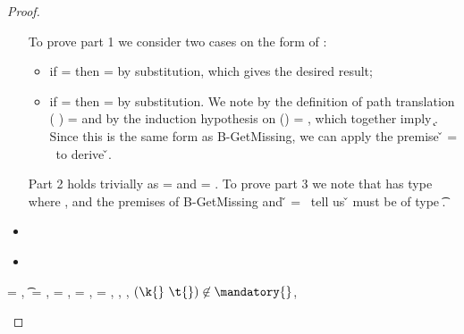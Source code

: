 \begin{lemma}
\begin{proof}
\begin{case}[T-GetHMapAbsent]
\begin{itemize}
\begin{subcase}[B-GetMissing]
         To prove part 1 we consider two cases on the form of : 
         \begin{itemize}
           \item
         if {} = \emptyobject{}
         then \object{} = \emptyobject{} by substitution, which gives the desired result;
           \item
         if  = { {}}
         then \object{} = { {}} by substitution.
         We note by the definition of path translation
         {\openv{}}({ {}}) =
         {}
         and by the induction hypothesis on 
         {{\openv{}}()} = {},
         which together imply 
         \inopenv {\openv{}} {\object{}} { {\k{}}}.
         Since this is the same form as B-GetMissing, we can apply the premise
        \v{} = \nil\ 
         to derive \inopenv {\openv{}} {\object{}} {\v{}}.
         \end{itemize}
         
         Part 2 holds trivially as \thenprop{\prop{}} = {\topprop{}}
         and \elseprop{\prop{}} = {\topprop{}}.
         To prove part 3 we note that  has type {\HMapgeneric {\mandatory{}} {\absent{}}}
         where {\inabsent{\k{}}{\absent{}}}, and
         the premises of B-GetMissing
         and
          \v{} = \nil\ 
         tell us {\v{}} must be of type {\t{}}.
      \end{subcase}
    \item[]
      \begin{subcase}[BE-Get1]
      \end{subcase}
    \item[]
      \begin{subcase}[BE-Get2]
      \end{subcase}
  \end{itemize}
\end{case}

\begin{case}[T-GetHMapPartialDefault]
  \e{} = { {}},
  \t{} = \Top,
  \thenprop{\prop{}} = {\topprop{}},
  \elseprop{\prop{}} = {\topprop{}},
  \object{} = {\replacefor
               { {\x{}}}
                          {}
                          {\x{}}},
  \judgementtwo {\propenv{}} { {}},
 \judgement {\propenv{}} { {\HMapp {\mandatory{}} {\absent}}}
           {\filterset {\thenprop {\prop{m}}} {}}
           {\object{m}},
             ${\notinmandatory{\k{}}{\t{}}{\mandatory{}}}$,
             {\notinabsent{\k{}}{\absent{}}}


\end{case}
\end{proof}
\end{lemma}
